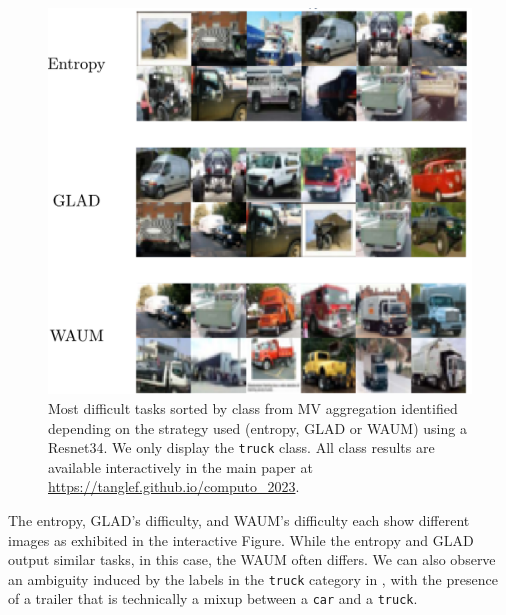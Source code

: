 \begin{figure}[htb]
    \centering
    \includegraphics[width=.8\textwidth]{./images_peerannot/c10h_identification.pdf}
    \caption{Most difficult tasks sorted by class from MV aggregation identified depending on the strategy used (entropy, GLAD or WAUM) using a Resnet34. We only display the \texttt{truck} class. All class results are available interactively in the main paper at \url{https://tanglef.github.io/computo_2023}.}
    \label{fig:identfication_c10h}
\end{figure}

The entropy, GLAD's difficulty, and WAUM's difficulty each show different images as exhibited in the interactive Figure. While the entropy and GLAD output similar tasks, in this case, the WAUM often differs. We can also observe an ambiguity induced by the labels in the \texttt{truck} category in , with the presence of a trailer that is technically a mixup between a \texttt{car} and a \texttt{truck}.

